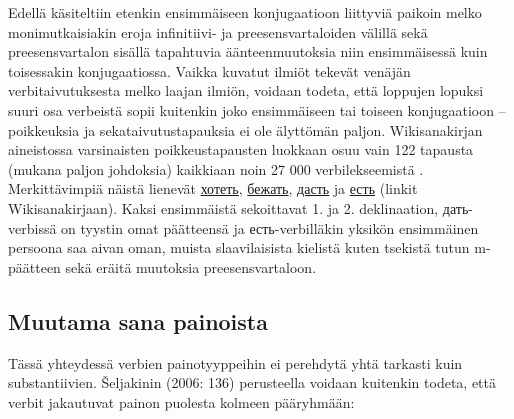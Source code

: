 \documentclass[]{scrartcl}
\begin{document}
Edellä käsiteltiin etenkin ensimmäiseen konjugaatioon liittyviä paikoin
melko monimutkaisiakin eroja infinitiivi- ja preesensvartaloiden välillä
sekä preesensvartalon sisällä tapahtuvia äänteenmuutoksia niin
ensimmäisessä kuin toisessakin konjugaatiossa. Vaikka kuvatut ilmiöt
tekevät venäjän verbitaivutuksesta melko laajan ilmiön, voidaan todeta,
että loppujen lopuksi suuri osa verbeistä sopii kuitenkin joko
ensimmäiseen tai toiseen konjugaatioon -- poikkeuksia ja
sekataivutustapauksia ei ole älyttömän paljon. Wikisanakirjan
aineistossa varsinaisten poikkeustapausten luokkaan osuu vain 122
tapausta (mukana paljon johdoksia) kaikkiaan noin 27 000
verbilekseemistä . Merkittävimpiä näistä lienevät
\href{http://ru.wiktionary.org/wiki/\%D1\%85\%D0\%BE\%D1\%82\%D0\%B5\%D1\%82\%D1\%8C}{хотеть},
\href{http://ru.wiktionary.org/wiki/\%D0\%B1\%D0\%B5\%D0\%B6\%D0\%B0\%D1\%82\%D1\%8C}{бежать},
\href{http://ru.wiktionary.org/wiki/\%D0\%B4\%D0\%B0\%D1\%81\%D1\%82\%D1\%8C}{дасть}
ja
\href{http://ru.wiktionary.org/wiki/\%D0\%B5\%D1\%81\%D1\%82\%D1\%8C}{есть}
(linkit Wikisanakirjaan). Kaksi ensimmäistä sekoittavat 1. ja 2.
deklinaation, дать-verbissä on tyystin omat päätteensä ja
есть-verbilläkin yksikön ensimmäinen persoona saa aivan oman, muista
slaavilaisista kielistä kuten tsekistä tutun m-päätteen sekä eräitä
muutoksia preesensvartaloon.

\subsection{Muutama sana painoista}\label{muutama-sana-painoista}

Tässä yhteydessä verbien painotyyppeihin ei perehdytä yhtä tarkasti kuin
substantiivien. Šeljakinin (2006: 136) perusteella voidaan kuitenkin
todeta, että verbit jakautuvat painon puolesta kolmeen pääryhmään:
\end{document}
